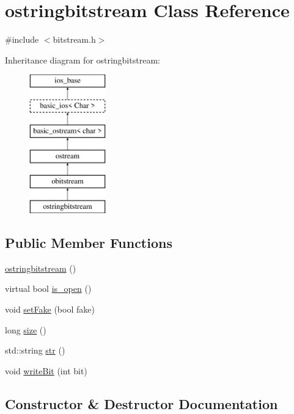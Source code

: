 \hypertarget{classostringbitstream}{}\section{ostringbitstream Class Reference}
\label{classostringbitstream}


{\ttfamily \#include $<$bitstream.\+h$>$}

Inheritance diagram for ostringbitstream\+:\begin{figure}[H]
\begin{center}
\leavevmode
\includegraphics[height=6.000000cm]{classostringbitstream}
\end{center}
\end{figure}
\subsection*{Public Member Functions}
\begin{DoxyCompactItemize}
\item 
\mbox{\hyperlink{classostringbitstream_a923b090c481c5ae2d59a45a4ebac5a24}{ostringbitstream}} ()
\item 
virtual bool \mbox{\hyperlink{classobitstream_a2f57f54d8c03b615bb31eee091d8a88a}{is\+\_\+open}} ()
\item 
void \mbox{\hyperlink{classobitstream_ad916b4624eb09d375514964f867b475c}{set\+Fake}} (bool fake)
\item 
long \mbox{\hyperlink{classobitstream_a22727e9c338fb1aaa6722031445373c3}{size}} ()
\item 
std\+::string \mbox{\hyperlink{classostringbitstream_a615ccd723733653b9e6a2d72563f1cab}{str}} ()
\item 
void \mbox{\hyperlink{classobitstream_a487c88ba2560a4657d18c3edb7d9d247}{write\+Bit}} (int bit)
\end{DoxyCompactItemize}


\subsection{Constructor \& Destructor Documentation}
\mbox{\label{classostringbitstream_a923b090c481c5ae2d59a45a4ebac5a24}} 
